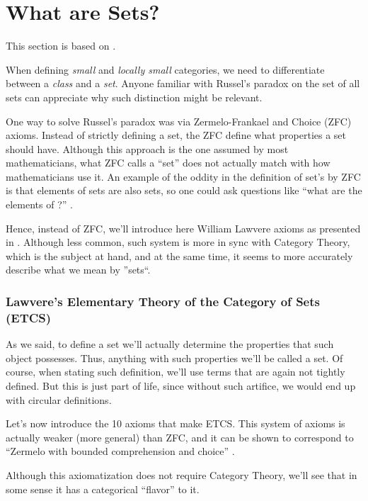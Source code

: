 \section{What are Sets?}

This section is based on \citet{leinster2014rethinking}.

When defining \textit{small} and \textit{locally small} categories, we need to
differentiate between a \textit{class} and a \textit{set}. Anyone familiar with
Russel's paradox on the set of all sets can appreciate why such distinction might be
relevant.

One way to solve Russel's paradox was via Zermelo-Frankael and Choice (ZFC) axioms.
Instead of strictly defining a set, the ZFC define what properties a set should have.
Although this approach is the one assumed by most mathematicians, what ZFC
calls a ``set'' does not actually match with how mathematicians use it.
An example of the oddity in the definition of set's by ZFC is that elements of sets are also
sets, so one could ask questions like ``what are the elements of \pi?'' \citep{leinster2014rethinking}.

Hence, instead of ZFC, we'll introduce here William Lawvere axioms as presented in \citet{leinster2014rethinking}. 
Although less common, such system is more in sync with Category Theory, which is the subject at hand, and at the same
time, it seems to more accurately describe what we mean by ''sets``.

\subsubsection{Lawvere's Elementary Theory of the Category of Sets (ETCS)}

As we said, to define a set we'll actually determine the properties that such object
possesses. Thus, anything with such properties we'll be called a set. Of course,
when stating such definition, we'll use terms that are again not tightly defined.
But this is just part of life, since without such artifice, we would end up with
circular definitions.

Let's now introduce the 10 axioms that make ETCS. This system of axioms is actually
weaker (more general) than ZFC, and it can be shown to correspond to
``Zermelo with bounded comprehension and choice'' \citep{leinster2014rethinking}.

Although this axiomatization does not require Category Theory, we'll see that in
some sense it has a categorical ``flavor'' to it.

